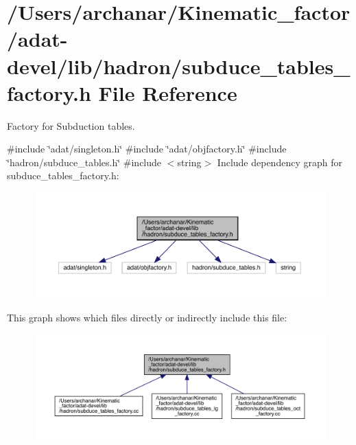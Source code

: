\hypertarget{adat-devel_2lib_2hadron_2subduce__tables__factory_8h}{}\section{/\+Users/archanar/\+Kinematic\+\_\+factor/adat-\/devel/lib/hadron/subduce\+\_\+tables\+\_\+factory.h File Reference}
\label{adat-devel_2lib_2hadron_2subduce__tables__factory_8h}


Factory for Subduction tables.  


{\ttfamily \#include \char`\"{}adat/singleton.\+h\char`\"{}}\newline
{\ttfamily \#include \char`\"{}adat/objfactory.\+h\char`\"{}}\newline
{\ttfamily \#include \char`\"{}hadron/subduce\+\_\+tables.\+h\char`\"{}}\newline
{\ttfamily \#include $<$string$>$}\newline
Include dependency graph for subduce\+\_\+tables\+\_\+factory.\+h\+:
\nopagebreak
\begin{figure}[H]
\begin{center}
\leavevmode
\includegraphics[width=350pt]{d4/d54/adat-devel_2lib_2hadron_2subduce__tables__factory_8h__incl}
\end{center}
\end{figure}
This graph shows which files directly or indirectly include this file\+:
\nopagebreak
\begin{figure}[H]
\begin{center}
\leavevmode
\includegraphics[width=350pt]{da/d94/adat-devel_2lib_2hadron_2subduce__tables__factory_8h__dep__incl}
\end{center}
\end{figure}

